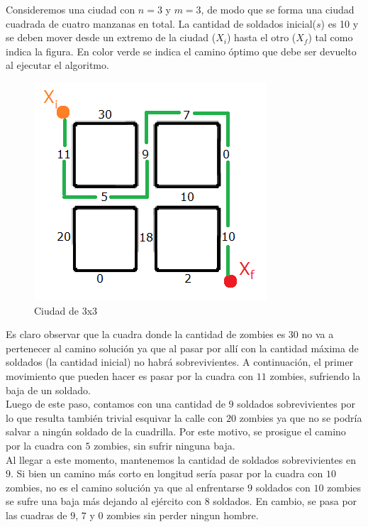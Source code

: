 Consideremos una ciudad con $n=3$ y $m=3$, de modo que se forma una ciudad cuadrada de cuatro manzanas en total. La cantidad de soldados inicial($s$) es 10 y se deben mover desde un extremo de la ciudad ($X_i$) hasta el otro ($X_f$) tal como indica la figura. En color verde se indica el camino \'optimo que debe ser devuelto al ejecutar el algoritmo.\\

  \begin{figure}[h!]
   \begin{center}
 	\includegraphics[scale=0.3]{imagenes/ej2/cuadras.png}
 	\caption{Ciudad de 3x3}
 	\label{ejemplitoCiudad}
   \end{center}
 \end{figure}

\newpage

Es claro observar que la cuadra donde la cantidad de zombies es $30$ no va a pertenecer al camino soluci\'on ya que al pasar por all\'i con la cantidad m\'axima de soldados (la cantidad inicial) no habr\'a sobrevivientes. A continuaci\'on, el primer movimiento que pueden hacer es pasar por la cuadra con $11$ zombies, sufriendo la baja de un soldado.\\

Luego de este paso, contamos con una cantidad de $9$ soldados sobrevivientes por lo que resulta tambi\'en trivial esquivar la calle con $20$ zombies ya que no se podr\'ia salvar a ning\'un soldado de la cuadrilla. Por este motivo, se prosigue el camino por la cuadra con $5$ zombies, sin sufrir ninguna baja.\\

Al llegar a este momento, mantenemos la cantidad de soldados sobrevivientes en $9$. Si bien un camino m\'as corto en longitud ser\'ia pasar por la cuadra con $10$ zombies, no es el camino soluci\'on ya que al enfrentarse $9$ soldados con $10$ zombies se sufre una baja m\'as dejando al ej\'ercito con $8$ soldados. En cambio, se pasa por las cuadras de $9$, $7$ y $0$ zombies sin perder ningun hombre.\\

